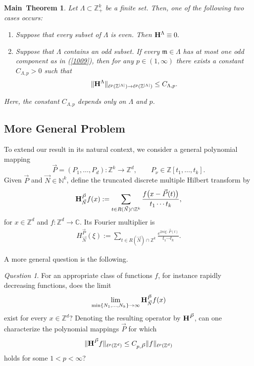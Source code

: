 \documentclass[11 pt,letterpaper]{amsart}
\theoremstyle{plain}
\newtheorem{main}{Main~Theorem}{}
\theoremstyle{definition}
\theoremstyle{remark} \theoremstyle{exam} \theoremstyle{ob}
\newtheorem{question}{Question}\numberwithin{question}{section}
\numberwithin{equation}{section}
\begin{document}
\begin{main}\label{mt2} 
Let $\Lambda \subset \mathbb{Z}_+^k$ be a finite set. Then, one of the following two cases occurs:
\begin{enumerate}
	\item[(i)] Suppose that every subset of $\Lambda$ is even. Then
	${\bf H}^{\Lambda} \equiv 0.$
	
	
	\item[(ii)] Suppose that $\Lambda$ contains an odd subset. 
	If every $\mathfrak{m} \in \Lambda$ has at most one odd component as in (\ref{1009}), then for any
	$p \in (1,\infty)$ there exists a constant $C_{\Lambda,p} > 0$ such that
	\[
	\| {\bf H}^{\Lambda} \|_{\ell^p(\mathbb{Z}^{|\Lambda|}) \to \ell^p(\mathbb{Z}^{|\Lambda|})}
	\le C_{\Lambda,p}.
	\]
\end{enumerate}
Here, the constant $C_{\Lambda,p}$ depends only on $\Lambda$ and $p$.
\end{main}






\subsection{More General Problem}
To extend our result in its natural context, we  consider a general polynomial mapping
\[
\vec P=(P_1,\ldots,P_d):\mathbb Z^k\to\mathbb Z^d,
\qquad
P_\nu\in\mathbb Z[t_1,\ldots,t_k].
\]
Given $\vec P$ and $\vec N\in\mathbb N^k$, define the truncated discrete
multiple Hilbert transform by
\begin{align}\label{mtp2}
	{\bf H}^{\vec P}_{\vec N}f(x)
	:=
	\sum_{t\in R(\vec N)\cap\mathbb Z^k}
	\frac{f\bigl(x-\vec P(t)\bigr)}{t_1\cdots t_k},
\end{align}for $x\in\mathbb Z^d$ and $f:\mathbb Z^d\to\mathbb C.$
Its Fourier multiplier is
\begin{align*}
	H^{\vec P}_{\vec N}(\xi)
	:=
	\sum_{t\in R(\vec N)\cap\mathbb Z^k}
	\frac{e^{2\pi i\xi\cdot\vec P(t)}}{t_1\cdots t_k}.
\end{align*}

A more general question is the following.

\medskip
\noindent
\begin{question}\label{q11}
	For an appropriate class of functions $f$, for instance rapidly decreasing
	functions, does the limit
	\[
	\lim_{\min\{N_1,\ldots,N_k\}\to\infty}
	{\bf H}^{\vec P}_{\vec N}f(x)
	\]
	exist for every $x\in\mathbb Z^d$? Denoting the resulting operator by
	${\bf H}^{\vec P}$, can one characterize the polynomial mappings $\vec P$
	for which
	\begin{align*}
		\|{\bf H}^{\vec P}f\|_{\ell^p(\mathbb Z^d)}
		\le
		C_{p,\vec P}\|f\|_{\ell^p(\mathbb Z^d)}
	\end{align*}
	holds for some $1<p<\infty$?
\end{question}
\end{document}
